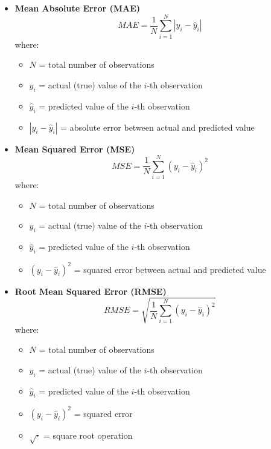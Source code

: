 \begin{itemize}

    \item \textbf{Mean Absolute Error (MAE)}
    \[
    MAE = \frac{1}{N}\sum_{i=1}^{N} |y_i - \hat{y}_i|
    \]
    where:
    \begin{itemize}
        \item $N$ = total number of observations
        \item $y_i$ = actual (true) value of the $i$-th observation
        \item $\hat{y}_i$ = predicted value of the $i$-th observation
        \item $|y_i - \hat{y}_i|$ = absolute error between actual and predicted value
    \end{itemize}

    \item \textbf{Mean Squared Error (MSE)}
    \[
    MSE = \frac{1}{N}\sum_{i=1}^{N} (y_i - \hat{y}_i)^2
    \]
    where:
    \begin{itemize}
        \item $N$ = total number of observations
        \item $y_i$ = actual (true) value of the $i$-th observation
        \item $\hat{y}_i$ = predicted value of the $i$-th observation
        \item $(y_i - \hat{y}_i)^2$ = squared error between actual and predicted value
    \end{itemize}

    \item \textbf{Root Mean Squared Error (RMSE)}
    \[
    RMSE = \sqrt{\frac{1}{N}\sum_{i=1}^{N} (y_i - \hat{y}_i)^2}
    \]
    where:
    \begin{itemize}
        \item $N$ = total number of observations
        \item $y_i$ = actual (true) value of the $i$-th observation
        \item $\hat{y}_i$ = predicted value of the $i$-th observation
        \item $(y_i - \hat{y}_i)^2$ = squared error
        \item $\sqrt{\cdot}$ = square root operation
    \end{itemize}


\end{itemize}
